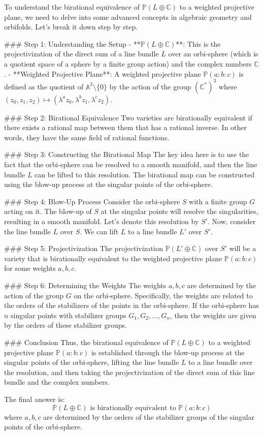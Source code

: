 To understand the birational equivalence of \(\mathbb{P}(L \oplus \mathbb{C})\) to a weighted projective plane, we need to delve into some advanced concepts in algebraic geometry and orbifolds. Let's break it down step by step.

### Step 1: Understanding the Setup
- **\(\mathbb{P}(L \oplus \mathbb{C})\)**: This is the projectivization of the direct sum of a line bundle \(L\) over an orbi-sphere (which is a quotient space of a sphere by a finite group action) and the complex numbers \(\mathbb{C}\).
- **Weighted Projective Plane**: A weighted projective plane \(\mathbb{P}(a:b:c)\) is defined as the quotient of \(\mathbb{A}^2 \setminus \{0\}\) by the action of the group \((\mathbb{C}^*)^3\) where \((z_0, z_1, z_2) \mapsto (\lambda^{a} z_0, \lambda^{b} z_1, \lambda^{c} z_2)\).

### Step 2: Birational Equivalence
Two varieties are birationally equivalent if there exists a rational map between them that has a rational inverse. In other words, they have the same field of rational functions.

### Step 3: Constructing the Birational Map
The key idea here is to use the fact that the orbi-sphere can be resolved to a smooth manifold, and then the line bundle \(L\) can be lifted to this resolution. The birational map can be constructed using the blow-up process at the singular points of the orbi-sphere.

### Step 4: Blow-Up Process
Consider the orbi-sphere \(S\) with a finite group \(G\) acting on it. The blow-up of \(S\) at the singular points will resolve the singularities, resulting in a smooth manifold. Let's denote this resolution by \(S'\). Now, consider the line bundle \(L\) over \(S\). We can lift \(L\) to a line bundle \(L'\) over \(S'\).

### Step 5: Projectivization
The projectivization \(\mathbb{P}(L' \oplus \mathbb{C})\) over \(S'\) will be a variety that is birationally equivalent to the weighted projective plane \(\mathbb{P}(a:b:c)\) for some weights \(a, b, c\).

### Step 6: Determining the Weights
The weights \(a, b, c\) are determined by the action of the group \(G\) on the orbi-sphere. Specifically, the weights are related to the orders of the stabilizers of the points in the orbi-sphere. If the orbi-sphere has \(n\) singular points with stabilizer groups \(G_1, G_2, \ldots, G_n\), then the weights are given by the orders of these stabilizer groups.

### Conclusion
Thus, the birational equivalence of \(\mathbb{P}(L \oplus \mathbb{C})\) to a weighted projective plane \(\mathbb{P}(a:b:c)\) is established through the blow-up process at the singular points of the orbi-sphere, lifting the line bundle \(L\) to a line bundle over the resolution, and then taking the projectivization of the direct sum of this line bundle and the complex numbers.

The final answer is:
\[
\boxed{\mathbb{P}(L \oplus \mathbb{C}) \text{ is birationally equivalent to } \mathbb{P}(a:b:c)}
\]
where \(a, b, c\) are determined by the orders of the stabilizer groups of the singular points of the orbi-sphere.